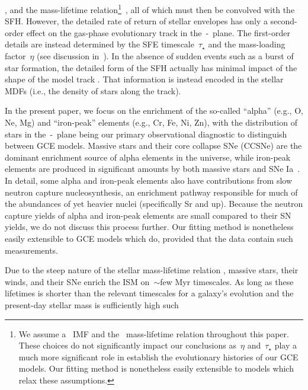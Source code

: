 \citep[e.g.,][]{Kalirai2008}, and the mass-lifetime relation\footnote{
	We assume a~\citet{Kroupa2001} IMF and the~\citet{Larson1974} mass-lifetime
	relation throughout this paper.
	These choices do not significantly impact our conclusions as~$\eta$
	and~$\tau_\star$ play a much more significant role in establish the
	evolutionary histories of our GCE models.
	Our fitting method is nonetheless easily extensible to models which relax
	these assumptions.
}~\citep*[e.g.,][]{Larson1974, Maeder1989, Hurley2000}, all of which must then
be convolved with the SFH.
However, the detailed rate of return of stellar envelopes has only a
second-order effect on the gas-phase evolutionary track in the~\afe-\feh~plane.
The first-order details are instead determined by the SFE timescale~$\tau_\star$
and the mass-loading factor~$\eta$ (see discussion in~\citealt{Weinberg2017b}).
In the absence of sudden events such as a burst of star formation, the detailed
form of the SFH actually has minimal impact of the shape of the model track
\citep{Weinberg2017b, Johnson2020}.
That information is instead encoded in the stellar MDFs (i.e., the density of
stars along the track).
\par
In the present paper, we focus on the enrichment of the so-called ``alpha''
(e.g., O, Ne, Mg) and ``iron-peak'' elements (e.g., Cr, Fe, Ni, Zn), with the
distribution of stars in the~\afe-\feh~plane being our primary observational
diagnostic to distinguish between GCE models.
Massive stars and their core collapse SNe (CCSNe) are the dominant enrichment
source of alpha elements in the universe, while iron-peak elements are produced
in significant amounts by both massive stars and SNe Ia~\citep[e.g.,][]{Johnson2019}.
In detail, some alpha and iron-peak elements also have contributions from slow
neutron capture nucleosynthesis, an enrichment pathway responsible for much of
the abundances of yet heavier nuclei (specifically Sr and up).
Because the neutron capture yields of alpha and iron-peak elements are
small compared to their SN yields, we do not discuss this process further.
Our fitting method is nonetheless easily extensible to GCE models which do,
provided that the data contain such measurements.
\par
Due to the steep nature of the stellar mass-lifetime relation
\citep[e.g.,][]{Larson1974, Maeder1989, Hurley2000}, massive stars, their winds,
and their SNe enrich the ISM on~$\sim$few Myr timescales.
As long as these lifetimes is shorter than the relevant timescales for a
galaxy's evolution and the present-day stellar mass is sufficiently high such
